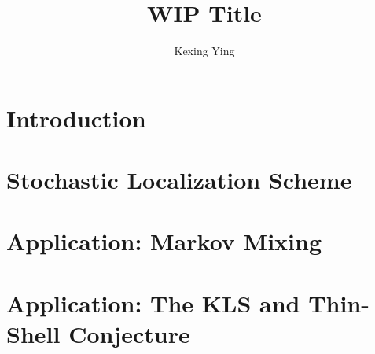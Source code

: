 \documentclass[]{article}
\title{WIP Title}
\author{Kexing Ying}
\theoremstyle{definition}
\begin{document}
\maketitle
\thispagestyle{empty}

\newpage
\tableofcontents
\thispagestyle{empty}

\newpage
\section{Introduction}
\label{sec:introduction}


\newpage
\section{Stochastic Localization Scheme}
\label{sec:stoch_loc}


\newpage
\section{Application: Markov Mixing}
\label{sec:mixing}


\newpage
\section{Application: The KLS and Thin-Shell Conjecture}
\label{sec:KLS}



\newpage


\end{document}
